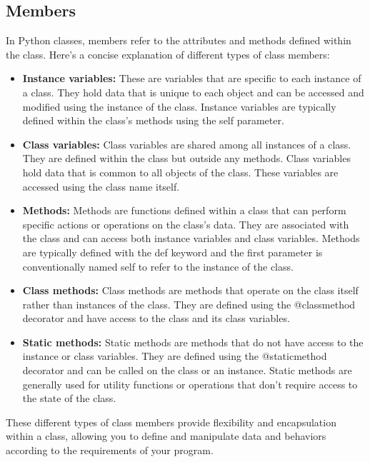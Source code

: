 \documentclass{report}
\begin{document}
    \subsection{Members}
    In Python classes, members refer to the attributes and methods defined within the class. Here's a concise explanation of different types of class members:
    \begin{itemize}
        \item \textbf{Instance variables:} These are variables that are specific to each instance of a class. They hold data that is unique to each object and can be accessed and modified using the instance of the class. Instance variables are typically defined within the class's methods using the self parameter.
        \item \textbf{Class variables:} Class variables are shared among all instances of a class. They are defined within the class but outside any methods. Class variables hold data that is common to all objects of the class. These variables are accessed using the class name itself.
        \item \textbf{Methods:} Methods are functions defined within a class that can perform specific actions or operations on the class's data. They are associated with the class and can access both instance variables and class variables. Methods are typically defined with the def keyword and the first parameter is conventionally named self to refer to the instance of the class.
        \item \textbf{Class methods:} Class methods are methods that operate on the class itself rather than instances of the class. They are defined using the @classmethod decorator and have access to the class and its class variables.
        \item \textbf{Static methods:} Static methods are methods that do not have access to the instance or class variables. They are defined using the @staticmethod decorator and can be called on the class or an instance. Static methods are generally used for utility functions or operations that don't require access to the state of the class.
    \end{itemize}
    These different types of class members provide flexibility and encapsulation within a class, allowing you to define and manipulate data and behaviors according to the requirements of your program.
    
    \bigbreak \noindent \bigbreak \noindent 
\end{document}
